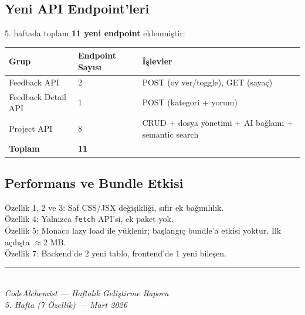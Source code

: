 \documentclass[12pt,a4paper]{article}
\begin{document}
\subsection{Yeni API Endpoint'leri}

5. haftada toplam \textbf{11 yeni endpoint} eklenmiştir:

\begin{tabularx}{\textwidth}{llX}
\toprule
\textbf{Grup} & \textbf{Endpoint Sayısı} & \textbf{İşlevler} \\
\midrule
Feedback API & 2 & POST (oy ver/toggle), GET (sayaç) \\
Feedback Detail API & 1 & POST (kategori + yorum) \\
Project API  & 8 & CRUD + dosya yönetimi + AI bağlamı + semantic search \\
\midrule
\textbf{Toplam} & \textbf{11} & \\
\bottomrule
\end{tabularx}

\subsection{Performans ve Bundle Etkisi}

Özellik 1, 2 ve 3: Saf CSS/JSX değişikliği, sıfır ek bağımlılık.\\
Özellik 4: Yalnızca \texttt{fetch} API'si, ek paket yok.\\
Özellik 5: Monaco lazy load ile yüklenir; başlangıç bundle'a etkisi yoktur. İlk açılışta $\approx$2 MB.\\
Özellik 7: Backend'de 2 yeni tablo, frontend'de 1 yeni bileşen.

\vspace{1cm}
\begin{center}
\textcolor{fuchsia}{\rule{10cm}{0.5pt}}\\[0.3em]
\textit{CodeAlchemist — Haftalık Geliştirme Raporu}\\
\textit{5. Hafta (7 Özellik) — Mart 2026}
\end{center}
\end{document}
